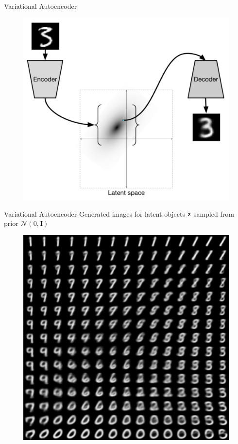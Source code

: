\begin{frame}{Variational Autoencoder}
	\begin{figure}[h]
		\centering
		\includegraphics[width=.7\linewidth]{figs/VAE.png}
	\end{figure}
\end{frame}
\begin{frame}{Variational Autoencoder}
	Generated images for latent objects $\mathbf{z}$ sampled from prior $\mathcal{N}(0, \mathbf{I})$
	\begin{figure}[h]
		\centering
		\includegraphics[width=.5\linewidth]{figs/vae_0.png}
	\end{figure}
\end{frame}
